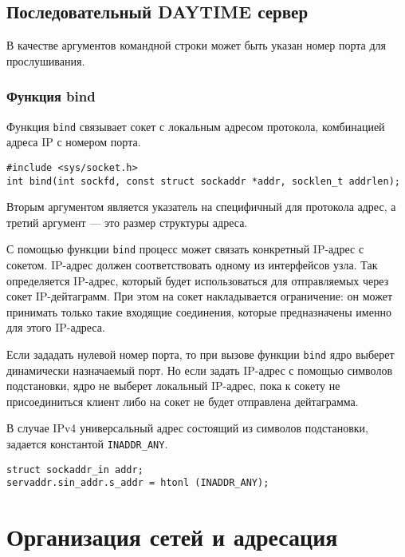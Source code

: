 \subsection{Последовательный DAYTIME сервер}
В качестве аргументов командной строки может быть указан номер порта для прослушивания.

\lstset{label=lst:date-server,caption=DAYTIME сервер}


\subsubsection{Функция bind}
Функция \lstinline{bind} связывает сокет с локальным адресом протокола, комбинацией адреса IP с номером порта.
\lstset{language=C,caption=}
\begin{lstlisting}
#include <sys/socket.h>
int bind(int sockfd, const struct sockaddr *addr, socklen_t addrlen);
\end{lstlisting}

Вторым аргументом является указатель на специфичный для протокола адрес, а третий аргумент --- это размер структуры адреса.

С помощью функции \lstinline{bind} процесс может связать конкретный IP-адрес с сокетом. IP-адрес должен соответствовать одному из интерфейсов узла. Так определяется IP-адрес, который будет использоваться для отправляемых через сокет IP-дейтаграмм. При этом на сокет накладывается ограничение: он может принимать только такие входящие соединения, которые предназначены именно для этого IP-адреса.

Если зададать нулевой номер порта, то при вызове функции \lstinline{bind} ядро выберет динамически назначаемый порт. Но если задать IP-адрес с помощью символов подстановки, ядро не выберет локальный IP-адрес, пока к сокету не присоединиться клиент либо на сокет не будет отправлена дейтаграмма.

В случае IPv4 универсальный адрес состоящий из символов подстановки, задается константой \lstinline{INADDR_ANY}.
\lstset{language=C,caption=}
\begin{lstlisting}
struct sockaddr_in addr;
servaddr.sin_addr.s_addr = htonl (INADDR_ANY);
\end{lstlisting}

\section{Организация сетей и адресация}
\label{sec:network-setup}

